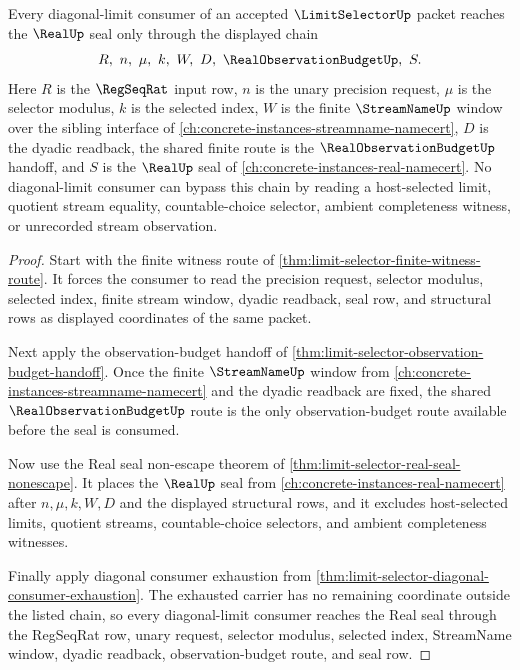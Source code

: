 \begin{theorem}
\label{thm:limit-selector-real-streamname-observation-lock}
Every diagonal-limit consumer of an accepted $\LimitSelectorUp$ packet reaches the $\RealUp$ seal only through the displayed chain
$$
R,\ n,\ \mu,\ k,\ W,\ D,\ \RealObservationBudgetUp,\ S.
$$
Here $R$ is the $\RegSeqRat$ input row, $n$ is the unary precision request, $\mu$ is the selector modulus, $k$ is the selected index, $W$ is the finite $\StreamNameUp$ window over the sibling interface of \autoref{ch:concrete-instances-streamname-namecert}, $D$ is the dyadic readback, the shared finite route is the $\RealObservationBudgetUp$ handoff, and $S$ is the $\RealUp$ seal of \autoref{ch:concrete-instances-real-namecert}. No diagonal-limit consumer can bypass this chain by reading a host-selected limit, quotient stream equality, countable-choice selector, ambient completeness witness, or unrecorded stream observation.
\end{theorem}
\begin{proof}
Start with the finite witness route of \autoref{thm:limit-selector-finite-witness-route}. It forces the consumer to read the precision request, selector modulus, selected index, finite stream window, dyadic readback, seal row, and structural rows as displayed coordinates of the same packet.

Next apply the observation-budget handoff of \autoref{thm:limit-selector-observation-budget-handoff}. Once the finite $\StreamNameUp$ window from \autoref{ch:concrete-instances-streamname-namecert} and the dyadic readback are fixed, the shared $\RealObservationBudgetUp$ route is the only observation-budget route available before the seal is consumed.

Now use the Real seal non-escape theorem of \autoref{thm:limit-selector-real-seal-nonescape}. It places the $\RealUp$ seal from \autoref{ch:concrete-instances-real-namecert} after $n,\mu,k,W,D$ and the displayed structural rows, and it excludes host-selected limits, quotient streams, countable-choice selectors, and ambient completeness witnesses.

Finally apply diagonal consumer exhaustion from \autoref{thm:limit-selector-diagonal-consumer-exhaustion}. The exhausted carrier has no remaining coordinate outside the listed chain, so every diagonal-limit consumer reaches the Real seal through the RegSeqRat row, unary request, selector modulus, selected index, StreamName window, dyadic readback, observation-budget route, and seal row.
\end{proof}

